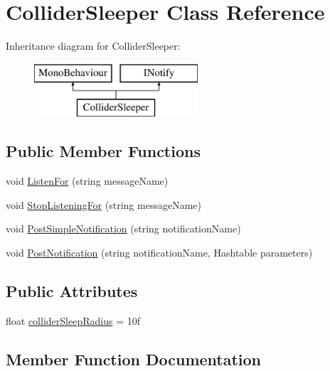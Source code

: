 \hypertarget{class_collider_sleeper}{}\section{Collider\+Sleeper Class Reference}
\label{class_collider_sleeper}
Inheritance diagram for Collider\+Sleeper\+:\begin{figure}[H]
\begin{center}
\leavevmode
\includegraphics[height=2.000000cm]{class_collider_sleeper}
\end{center}
\end{figure}
\subsection*{Public Member Functions}
\begin{DoxyCompactItemize}
\item 
void \hyperlink{class_collider_sleeper_a634ccbe22f8528e50b09347f36e56630}{Listen\+For} (string message\+Name)
\item 
void \hyperlink{class_collider_sleeper_ad445154783962765218c68260a850c11}{Stop\+Listening\+For} (string message\+Name)
\item 
void \hyperlink{class_collider_sleeper_a55b6e0cfc564aa09ca075c07cd53f5db}{Post\+Simple\+Notification} (string notification\+Name)
\item 
void \hyperlink{class_collider_sleeper_a21d1afabf66c9c71710e6b38ad1cd02e}{Post\+Notification} (string notification\+Name, Hashtable parameters)
\end{DoxyCompactItemize}
\subsection*{Public Attributes}
\begin{DoxyCompactItemize}
\item 
float \hyperlink{class_collider_sleeper_affd49008c226db3acf957ffb5d315c04}{collider\+Sleep\+Radius} = 10f
\end{DoxyCompactItemize}


\subsection{Member Function Documentation}
